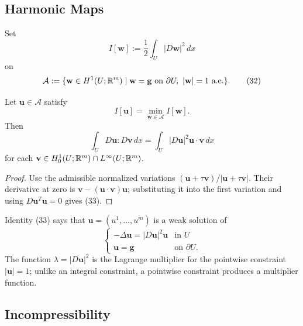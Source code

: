 \subsection{Harmonic Maps}
\label{sec:harmonic-maps-pointwise-constraints}

Set
\[
I[\mathbf w]:=\frac12\int_U|D\mathbf w|^2\,dx
\tag{31}
\]
on
\[
\mathcal A:=\{\mathbf w\in H^1(U;\mathbb{R}^m)\mid
\mathbf w=\mathbf g\text{ on }\partial U,\ |\mathbf w|=1\text{ a.e.}\}.
\tag{32}
\]

\begin{theorem}
\label{thm:euler-lagrange-harmonic-maps}
Let $\mathbf{u} \in \mathcal{A}$ satisfy
\[
I[\mathbf{u}] = \min_{\mathbf{w} \in \mathcal{A}} I[\mathbf{w}].
\]
Then
\[
\int_U D\mathbf{u} : D\mathbf{v}\, dx = \int_U |D\mathbf{u}|^2 \mathbf{u} \cdot \mathbf{v}\, dx
\tag{33}
\]
for each $\mathbf{v} \in H_0^1(U;\mathbb{R}^m) \cap L^\infty(U;\mathbb{R}^m)$.
\end{theorem}

\begin{proof}
\sketch Use the admissible normalized variations $(\mathbf u+\tau\mathbf v)/|\mathbf u+\tau\mathbf v|$. Their derivative at zero is $\mathbf v-(\mathbf u\cdot\mathbf v)\mathbf u$; substituting it into the first variation and using $D\mathbf u^T\mathbf u=0$ gives (33).
\end{proof}

\begin{remark}
\label{rem:harmonic-maps-lagrange-multiplier-function}

Identity (33) says that $\mathbf u=(u^1,\ldots,u^m)$ is a weak solution of
\[
\begin{cases} -\Delta \mathbf{u} = |D\mathbf{u}|^2 \mathbf{u} & \text{in } U \\ \mathbf{u} = \mathbf{g} & \text{on } \partial U. \end{cases}
\tag{34}
\]
The function $\lambda=|D\mathbf u|^2$ is the Lagrange multiplier for the pointwise constraint $|\mathbf u|=1$; unlike an integral constraint, a pointwise constraint produces a multiplier function.
\end{remark}

\subsection{Incompressibility}
\label{sec:incompressibility-constraints}

